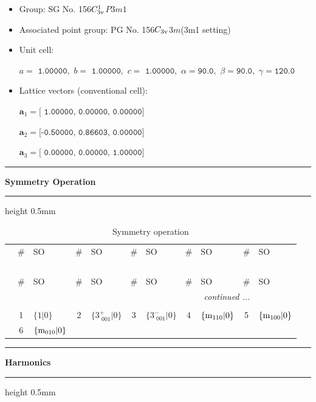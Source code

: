 \documentclass[fleqn,10pt,landscape]{jsarticle}
\begin{document}
\begin{itemize}
\item Group: SG No. 156\quad$C_{\rm 3v}^{1}$\quad$P3m1$\quad[ trigonal ]
\item Associated point group: PG No. 156\quad$C_{\rm 3v}$\quad$3m$\quad(3m1 setting)\quad[ trigonal ]
\end{itemize}
\begin{itemize}
\item Unit cell:

\quad $a=\texttt{ 1.00000},\,\, b=\texttt{ 1.00000},\,\, c=\texttt{ 1.00000},\,\, \alpha=\texttt{90.0},\,\, \beta=\texttt{90.0},\,\, \gamma=\texttt{120.0}$

\item Lattice vectors (conventional cell):

\quad $\bm{a}_1=\texttt{[ 1.00000, 0.00000, 0.00000]}$

\quad $\bm{a}_2=\texttt{[-0.50000, 0.86603, 0.00000]}$

\quad $\bm{a}_3=\texttt{[ 0.00000, 0.00000, 1.00000]}$

\end{itemize}
\vspace{5mm}
\noindent \rule[0.5mm]{5mm}{0.5mm}\hspace{3mm}\textbf{Symmetry Operation}\hspace{3mm}\leaders\hrule height 0.5mm\hfill\kern0pt
\vspace{3mm}

\renewcommand{\arraystretch}{1.6}
\begin{longtable}[l]{c|cl|cl|cl|cl|cl}
\captionsetup{justification=raggedright, singlelinecheck=off}
\caption{Symmetry operation}
 \\
 \hline \hline
 & \# & SO & \# & SO & \# & SO & \# & SO & \# & SO \\ \hline \endfirsthead

\multicolumn{10}{l}{\tablename\ \thetable{}} \\
 \hline \hline
 & \# & SO & \# & SO & \# & SO & \# & SO & \# & SO \\ \hline \endhead

 \hline \hline
\multicolumn{10}{r}{\footnotesize\it continued ...} \\ \endfoot

 \hline \hline
\multicolumn{10}{r}{} \\ \endlastfoot

 & 1 & $\{1|0\}$ & 2 & $\{3^{+}_{\,\,001}|0\}$ & 3 & $\{3^{-}_{\,\,001}|0\}$ & 4 & $\{{\rm m}_{110}|0\}$ & 5 & $\{{\rm m}_{100}|0\}$ \\
& 6 & $\{{\rm m}_{010}|0\}$ &  &  &  &  &  &  &  &  \\
\end{longtable}
\vspace{5mm}
\noindent \rule[0.5mm]{5mm}{0.5mm}\hspace{3mm}\textbf{Harmonics}\hspace{3mm}\leaders\hrule height 0.5mm\hfill\kern0pt
\vspace{3mm}
\end{document}
